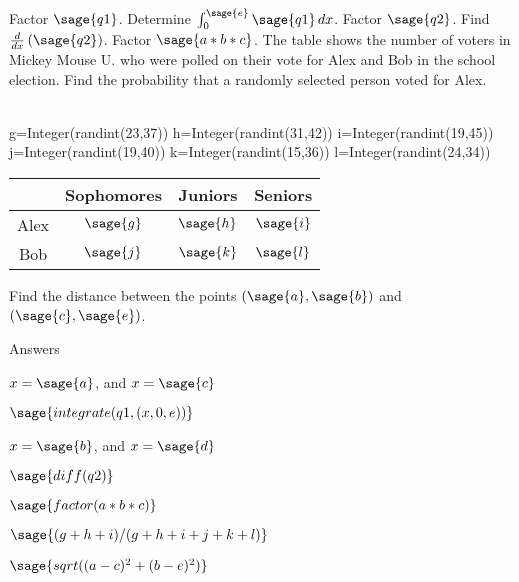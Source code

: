 \documentclass[a4paper,addpoints,12point]{exam}%
\begin{document}
\begin{questions}
\bracketedpoints
\question[4]
Factor $\sage{q1}$.
\answerline
\vspace{0.85in}
\question[4]
Determine  $\int_{0}^{\sage{e}}\sage{q1}\,dx$.
\answerline
\vspace{0.85in}
\question[5]
Factor $\sage{q2}$.
\answerline
\vspace{0.85in}
\question[6]
Find $\frac{d}{dx}\left(\sage{q2}\right)$.
\answerline
\newpage
\question[5]
Factor $\sage{a*b*c}$.
\answerline
\vspace{0.85in}
\question[4]
The table shows the number of voters in Mickey Mouse U. who were polled on their vote for Alex and Bob in the school election. Find the probability that a randomly selected person voted for Alex.
\\\\
\begin{sagesilent}
 g=Integer(randint(23,37))
 h=Integer(randint(31,42))
 i=Integer(randint(19,45))
 j=Integer(randint(19,40))
 k=Integer(randint(15,36))
 l=Integer(randint(24,34))
\end{sagesilent}

\begin{tabular}{c|c|c|c}
 & Sophomores & Juniors & Seniors\\
\hline
Alex & $\sage{g}$ & $\sage{h}$ & $\sage{i}$\\
\hline
Bob & $\sage{j}$ & $\sage{k}$ & $\sage{l}$\\
\hline
\end{tabular}
\answerline
\vspace{0.85in}
\question[6]
Find the distance between the points $(\sage{a},\sage{b})$ and $(\sage{c},\sage{e})$.
\newpage
\begin{center}
{\large Answers}
\end{center}
\begin{solution}
$x=\sage{a}$, and $x=\sage{c}$
\end{solution}
\begin{solution}
$\sage{integrate(q1,(x,0,e))}$
\end{solution}
\begin{solution}
$x=\sage{b}$, and $x=\sage{d}$
\end{solution}
\begin{solution}
$\sage{diff(q2)}$
\end{solution}
\begin{solution}
$\sage{factor(a*b*c)}$
\end{solution}
\begin{solution}
$\sage{(g+h+i)/(g+h+i+j+k+l)}$
\end{solution}
\begin{solution}
$\sage{sqrt((a-c)^2+(b-e)^2)}$
\end{solution}
\end{questions}
\end{document}
